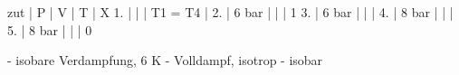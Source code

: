 zut | P | V | T | X  
1. | | | T1 = T4 |  
2. | 6 bar | | | 1  
3. | 6 bar | | |  
4. | 8 bar | | |  
5. | 8 bar | | | 0  

- isobare Verdampfung, 6 K
- Volldampf, isotrop
- isobar